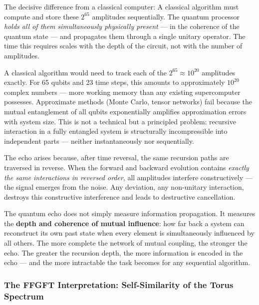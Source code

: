 The decisive difference from a classical computer:
A classical algorithm must compute and store these $2^{65}$ amplitudes sequentially.
The quantum processor \emph{holds all of them simultaneously physically present} —
in the coherence of the quantum state — and propagates them through a single unitary
operator. The time this requires scales with the depth of the circuit, not with the
number of amplitudes.

\begin{technical}
A classical algorithm would need to track each of the $2^{65} \approx 10^{20}$
amplitudes exactly. For 65 qubits and 23 time steps, this amounts to approximately
$10^{20}$ complex numbers — more working memory than any existing supercomputer
possesses. Approximate methods (Monte Carlo, tensor networks) fail because the mutual
entanglement of all qubits exponentially amplifies approximation errors with system
size. This is not a technical but a principled problem: recursive interaction in a
fully entangled system is structurally incompressible into independent parts —
neither instantaneously nor sequentially.
\end{technical}

The echo arises because, after time reversal, the same recursion paths are traversed
in reverse. When the forward and backward evolution contains \emph{exactly the same
interactions in reversed order}, all amplitudes interfere constructively — the signal
emerges from the noise. Any deviation, any non-unitary interaction, destroys this
constructive interference and leads to destructive cancellation.

\begin{keypoint}
The quantum echo does not simply measure information propagation. It measures the
\textbf{depth and coherence of mutual influence}: how far back a system can
reconstruct its own past state when every element is simultaneously influenced by
all others.
The more complete the network of mutual coupling, the stronger the echo.
The greater the recursion depth, the more information is encoded in the echo — and
the more intractable the task becomes for any sequential algorithm.
\end{keypoint}

\subsubsection*{The FFGFT Interpretation: Self-Similarity of the Torus Spectrum}

